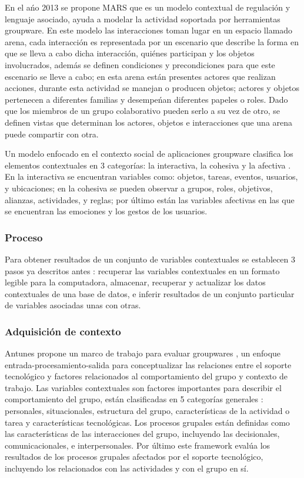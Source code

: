 En el a\'no 2013 se propone MARS\(\) que es un modelo contextual de regulaci\'on y lenguaje asociado, ayuda a modelar la actividad soportada por herramientas groupware. En este modelo las interacciones toman lugar en un espacio llamado arena, cada interacci\'on es representada por un escenario que describe la forma en que se lleva a cabo dicha interacci\'on, qui\'enes participan y los objetos involucrados, adem\'as se definen condiciones y precondiciones para que este escenario se lleve a cabo; en esta arena est\'an presentes actores que realizan acciones, durante esta actividad se manejan o producen objetos; actores y objetos pertenecen a diferentes familias y desempe\'nan diferentes papeles o roles. Dado que los miembros de un grupo colaborativo pueden serlo a su vez de otro, se definen vistas que determinan los actores, objetos e interacciones que una arena puede compartir con otra.

Un modelo enfocado en el contexto social de aplicaciones groupware clasifica los elementos contextuales en 3 categor\'ias: la interactiva, la cohesiva y la afectiva \cite{montane2013context}. En la interactiva se encuentran variables como: objetos, tareas, eventos, usuarios, y ubicaciones; en la cohesiva se pueden observar a grupos, roles, objetivos, alianzas, actividades, y reglas; por \'ultimo est\'an las variables afectivas en las que se encuentran las emociones y los gestos de los usuarios.	
\subsubsection{Proceso}
Para obtener resultados de un conjunto de variables contextuales se establecen 3 pasos ya descritos antes \cite{montane2013context}: recuperar las variables contextuales en un formato legible para la computadora, almacenar, recuperar y actualizar los datos contextuales de una base de datos, e inferir resultados de un conjunto particular de variables asociadas unas con otras.

\subsubsection {Adquisici\'on de contexto}
 Antunes propone un marco de trabajo para evaluar groupwares \cite{antunes2008structuring}, un enfoque entrada-procesamiento-salida para conceptualizar las relaciones entre el soporte tecnol\'ogico y factores relacionados al comportamiento del grupo y contexto de trabajo. Las variables contextuales son factores importantes para describir el comportamiento del grupo, est\'an clasificadas en 5 categor\'ias generales \cite{antunes2008structuring}: personales, situacionales, estructura del grupo, caracter\'isticas de la actividad o tarea y caracter\'isticas tecnol\'ogicas. Los procesos grupales est\'an definidas como las caracter\'isticas de las interacciones del grupo, incluyendo las decisionales, comunicacionales, e interpersonales. Por \'ultimo este framework eval\'ua los resultados de los procesos grupales afectados por el soporte tecnol\'ogico, incluyendo los relacionados con las actividades y con el grupo en s\'i.

